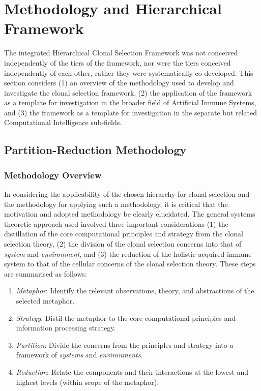%
%
\section{Methodology and Hierarchical Framework}
\label{sec:framework:ihcsf:applicability}
The integrated Hierarchical Clonal Selection Framework was not conceived independently of the tiers of the framework, nor were the tiers conceived independently of each other, rather they were systematically co-developed. This section considers (1) an overview of the methodology used to develop and investigate the clonal selection framework, (2) the application of the framework as a template for investigation in the broader field of Artificial Immune Systems, and (3) the framework as a template for investigation in the separate but related Computational Intelligence sub-fields.

%
%
\subsection{Partition-Reduction Methodology}
\label{subsec:framework:ihcsf:applicability:methodology}

%
%
\subsubsection{Methodology Overview}
In considering the applicability of the chosen hierarchy for clonal selection and the methodology for applying such a methodology, it is critical that the motivation and adopted methodology be clearly elucidated.
The general systems theoretic approach used involved three important considerations (1) the distillation of the core computational principles and strategy from the clonal selection theory,  (2) the division of the clonal selection concerns into that of \emph{system} and \emph{environment}, and (3) the reduction of the holistic acquired immune system to that of the cellular concerns of the clonal selection theory. These steps are summarised as follows:

\begin{enumerate}
	\item \emph{Metaphor}: Identify the relevant observations, theory, and abstractions of the selected metaphor.
	\item \emph{Strategy}: Distil the metaphor to the core computational principles and information processing strategy.
	\item \emph{Partition}: Divide the concerns from the principles and strategy into a framework of \emph{systems} and \emph{environments}.
	\item \emph{Reduction}: Relate the components and their interactions at the lowest and highest levels (within scope of the metaphor).	
\end{enumerate}

